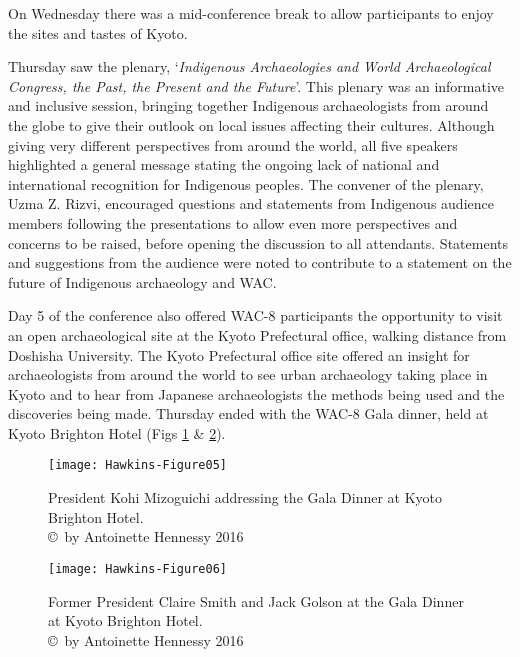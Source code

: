 \documentclass[spanish]{ijsra}
\begin{document}
On Wednesday there was a mid-conference break to allow participants to enjoy the sites and tastes of Kyoto. 

Thursday saw the plenary, ‘\textit{Indigenous Archaeologies and World Archaeological Congress, the Past, the Present and the Future}’. This plenary was an informative and inclusive session, bringing together Indigenous archaeologists from around the globe to give their outlook on local issues affecting their cultures. Although giving very different perspectives from around the world, all five speakers highlighted a general message stating the ongoing lack of national and international recognition for Indigenous peoples. The convener of the plenary, Uzma Z. Rizvi, encouraged questions and statements from Indigenous audience members following the presentations to allow even more perspectives and concerns to be raised, before opening the discussion to all attendants. Statements and suggestions from the audience were noted to contribute to a statement on the future of Indigenous archaeology and WAC.  

Day 5 of the conference also offered WAC-8 participants the opportunity to visit an open archaeological site at the Kyoto Prefectural office, walking distance from Doshisha University. The Kyoto Prefectural office site offered an insight for archaeologists from around the world to see urban archaeology taking place in Kyoto and to hear from Japanese archaeologists the methods being used and the discoveries being made. Thursday ended with the WAC-8 Gala dinner, held at Kyoto Brighton Hotel (Figs \ref{fig:Hawkins-Figure05} \& \ref{fig:Hawkins-Figure06}). 

\begin{figure}[!htb] %
	\centering
	\texttt{[image: Hawkins-Figure05]}
	\caption{President Kohi Mizoguichi addressing the Gala Dinner at Kyoto Brighton Hotel. 
		{\normalfont\scriptsize \\ \copyright\ by Antoinette Hennessy 2016}}
	\label{fig:Hawkins-Figure05}
\end{figure}

\begin{figure}[!htb] %
	\centering
	\texttt{[image: Hawkins-Figure06]}
	\caption{Former President Claire Smith and Jack Golson at the Gala Dinner at Kyoto Brighton Hotel. 
		{\normalfont\scriptsize \\ \copyright\ by Antoinette Hennessy 2016}}
	\label{fig:Hawkins-Figure06}
\end{figure}
\end{document}
